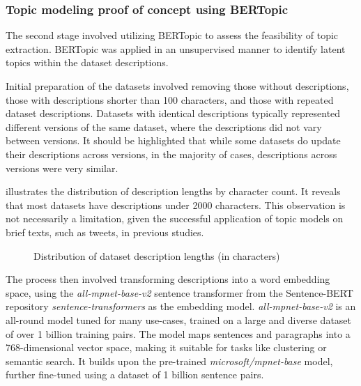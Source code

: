 \documentclass{article}
\begin{document}
\subsubsection{Topic modeling proof of concept using BERTopic}

The second stage involved utilizing BERTopic to assess the feasibility of topic extraction. BERTopic was applied in an unsupervised manner to identify latent topics within the dataset descriptions.

Initial preparation of the datasets involved removing those without descriptions, those with descriptions shorter than 100 characters, and those with repeated dataset descriptions. Datasets with identical descriptions typically represented different versions of the same dataset, where the descriptions did not vary between versions. It should be highlighted that while some datasets do update their descriptions across versions, in the majority of cases, descriptions across versions were very similar.

 illustrates the distribution of description lengths by character count. It reveals that most datasets have descriptions under 2000 characters. This observation is not necessarily a limitation, given the successful application of topic models on brief texts, such as tweets, in previous studies.

\begin{figure}[h] %
    \centering
    
    \caption{Distribution of dataset description lengths (in characters)}
    \label{fig:description_length_histogram}
\end{figure}

The process then involved transforming descriptions into a word embedding space, using the \textit{all-mpnet-base-v2} \cite{noauthor_sentence-transformersall-mpnet-base-v2_2024} sentence transformer from the Sentence-BERT repository \cite{reimers_sentence-bert_2019} \textit{sentence-transformers} as the embedding model. \textit{all-mpnet-base-v2} is an all-round model tuned for many use-cases, trained on a large and diverse dataset of over 1 billion training pairs. The model maps sentences and paragraphs into a 768-dimensional vector space, making it suitable for tasks like clustering or semantic search. It builds upon the pre-trained \textit{microsoft/mpnet-base} \cite{noauthor_microsoftmpnet-base_nodate} model, further fine-tuned using a dataset of 1 billion sentence pairs.
\end{document}
